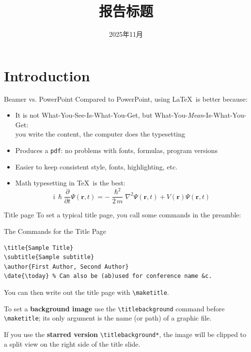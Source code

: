 \documentclass{beamer}
\title{\CJKfontspec{Microsoft YaHei}报告标题}
\date{2025年11月}
\begin{document}
\maketitle

\section{Introduction}

\begin{frame}{Beamer vs. PowerPoint}
Compared to PowerPoint, using \LaTeX\ is better because:
\begin{itemize}
\item It is not What-You-See-Is-What-You-Get, but
What-You-\emph{Mean}-Is-What-You-Get:\\
you write the content, the computer does the typesetting
\item Produces a \texttt{pdf}: no problems with fonts, formulas,
      program versions
\item Easier to keep consistent style, fonts, highlighting, etc.
\item Math typesetting in \TeX\ is the best:
\begin{equation*}
\mathrm{i}\,\hslash\frac{\partial}{\partial t} \Psi(\mathbf{r},t) =
-\frac{\hslash^2}{2\,m}\nabla^2\Psi(\mathbf{r},t)
+ V(\mathbf{r})\Psi(\mathbf{r},t)
\end{equation*}

\end{itemize}
\end{frame}


\begin{frame}[fragile]{Title page}
To set a typical title page, you call some commands in the preamble:
\begin{block}{The Commands for the Title Page}
\begin{verbatim}
\title{Sample Title}
\subtitle{Sample subtitle}
\author{First Author, Second Author}
\date{\today} % Can also be (ab)used for conference name &c.
\end{verbatim}
\end{block}
You can then write out the title page with \verb|\maketitle|.

To set a \textbf{background image} use the \verb|\titlebackground| command 
before \verb|\maketitle|; its only argument is the name (or path) of a graphic 
file.

If you use the \textbf{starred version} \verb|\titlebackground*|, the image 
will be clipped to a split view on the right side of the title slide.

\end{frame}
\end{document}
